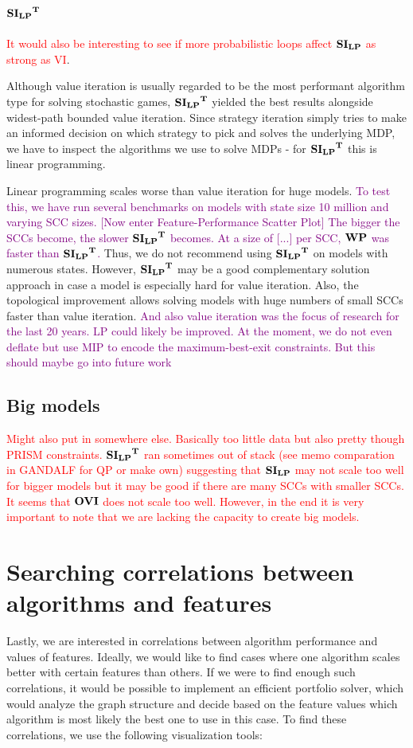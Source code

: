 \subsection{$\mathbf{\mathbf{SI_{LP}}^T}$}
\textcolor{red}{It would also be interesting to see if more probabilistic loops affect $\mathbf{SI_{LP}}$ as strong as VI}.

Although value iteration is usually regarded to be the most performant algorithm type for solving stochastic games, 
$\mathbf{\mathbf{SI_{LP}}^T}$ yielded the best results alongside widest-path bounded value iteration.
Since strategy iteration simply tries to make an informed decision on which strategy to pick and solves the underlying MDP, 
we have to inspect the algorithms we use to solve MDPs - for $\mathbf{\mathbf{SI_{LP}}^T}$ this is linear programming.

Linear programming scales worse than value iteration for huge models. \textcolor{purple}{To test this, we have 
run several benchmarks on models with state size 10 million and varying SCC sizes. [Now enter Feature-Performance Scatter Plot] 
The bigger the SCCs become, the slower $\mathbf{\mathbf{SI_{LP}}^T}$ becomes. At a size of [...] per SCC, $\mathbf{WP}$ was faster than $\mathbf{\mathbf{SI_{LP}}^T}$.}
Thus, we do not recommend using $\mathbf{\mathbf{SI_{LP}}^T}$ on models with numerous states.
However, $\mathbf{\mathbf{SI_{LP}}^T}$ may be a good complementary solution approach in case a model is especially hard for value iteration.
Also, the topological improvement allows solving models with huge numbers of small SCCs faster than value iteration.
\textcolor{purple}{And also value iteration was the focus of research for the last 20 years. 
LP could likely be improved. At the moment, we do not even deflate but use MIP to encode the maximum-best-exit constraints. But this should maybe go into future work}

\subsection{Big models}
\textcolor{red}{Might also put in somewhere else. Basically too little data but also pretty though PRISM constraints.
$\mathbf{\mathbf{SI_{LP}}^T}$ ran sometimes out of stack (see memo comparation in GANDALF for QP or make own) suggesting that $\mathbf{SI_{LP}}$ may not scale too well 
for bigger models but it may be good if there are many SCCs with smaller SCCs.
It seems that $\mathbf{OVI}$ does not scale too well. However, in the end it is very important to note that we are lacking the capacity to create
big models.}

\section{Searching correlations between algorithms and features}
Lastly, we are interested in correlations between algorithm performance and values of features.
Ideally, we would like to find cases where one algorithm scales better with certain features than others.
If we were to find enough such correlations, it would be possible to implement an efficient portfolio solver, which
would analyze the graph structure and decide based on the feature values which algorithm is most likely the best one to use in this case.
To find these correlations, we use the following visualization tools:

